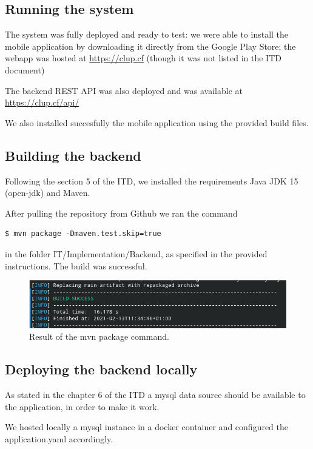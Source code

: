 \subsection{Running the system}

The system was fully deployed and ready to test: we were able to install the mobile application by downloading it directly from the Google Play Store; the webapp was hosted at \href{https://clup.cf}{https://clup.cf} (though it was not listed in the ITD document)

The backend REST API was also deployed and was available at \href{https://clup.cf/api/}{https://clup.cf/api/}

We also installed succesfully the mobile application using the provided build files.

\subsection{Building the backend}

Following the section 5 of the ITD, we installed the requirements Java JDK 15 (open-jdk) and Maven.

After pulling the repository from Github we ran the command
\begin{lstlisting}[columns=fullflexible]
    $ mvn package -Dmaven.test.skip=true
\end{lstlisting}
in the folder IT/Implementation/Backend, as specified in the provided instructions. The build was successful.
\begin{figure}[ht]
    \centering
    \includegraphics[width=\textwidth]{Images/package.jpg}
    \caption{\label{fig:Booked_Ticket_State}Result of the mvn package command.}
\end{figure}

\subsection{Deploying the backend locally}
As stated in the chapter 6 of the ITD a mysql data source should be available to the application, in order to make it work.

We hosted locally a mysql instance in a docker container and configured the application.yaml accordingly.

